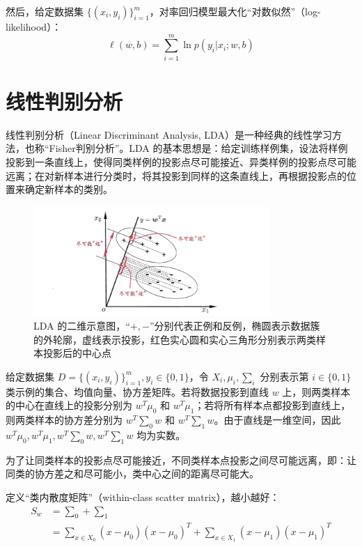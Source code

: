 \documentclass[12pt, a4paper]{article} %
\begin{document}
然后，给定数据集 $\{(x_i, y_i)\}_{i = 1}^{m}$，对率回归模型最大化“对数似然”（log-likelihood）：
\begin{equation*}
    \ell (w,b) = \sum\limits_{i = 1}^m {\ln p({y_i}|{x_i};w,b)}
\end{equation*}

\section{线性判别分析}

线性判别分析（Linear Discriminant Analysis, LDA）是一种经典的线性学习方法，也称“Fisher判别分析”。LDA 的基本思想是：给定训练样例集，设法将样例投影到一条直线上，使得同类样例的投影点尽可能接近、异类样例的投影点尽可能远离；在对新样本进行分类时，将其投影到同样的这条直线上，再根据投影点的位置来确定新样本的类别。

\begin{figure}[H]
    \centering
    \includegraphics[width=0.8\textwidth]{../img/3-3-LDA的二维示意图.png}
    \caption{LDA 的二维示意图，“$+, -$”分别代表正例和反例，椭圆表示数据簇的外轮廓，虚线表示投影，红色实心圆和实心三角形分别表示两类样本投影后的中心点}
    \label{fig:label}
\end{figure}

给定数据集 $D = \{(x_i, y_i)\}_{i = 1}^{m}, y_i \in \{0, 1\}$，令 $X_i, \mu_i, \sum_i$ 分别表示第 $i \in \{0, 1\}$ 类示例的集合、均值向量、协方差矩阵。若将数据投影到直线 $w$ 上，则两类样本的中心在直线上的投影分别为 $w^T\mu_0$ 和 $w^T \mu_1$；若将所有样本点都投影到直线上，则两类样本的协方差分别为 $w^T \sum_0 w$ 和 $w^T \sum_1 w$。由于直线是一维空间，因此 $w^T\mu_0, w^T \mu_1, w^T \sum_0 w, w^T \sum_1 w$ 均为实数。

为了让同类样本的投影点尽可能接近，不同类样本点投影之间尽可能远离，即：让同类的协方差之和尽可能小，类中心之间的距离尽可能大。

定义“类内散度矩阵”（within-class scatter matrix），越小越好：
\begin{equation*}
    \begin{array}{*{20}{l}}
        {{S_w}}&{ = {\sum _0} + {\sum _1}}\\
        {}&{ = \sum\limits_{x \in {X_0}} {(x - {\mu _0}){{(x - {\mu _0})}^T}}  + \sum\limits_{x \in {X_1}} {(x - {\mu _1}){{(x - {\mu _1})}^T}} }
    \end{array}
\end{equation*}
\end{document}
